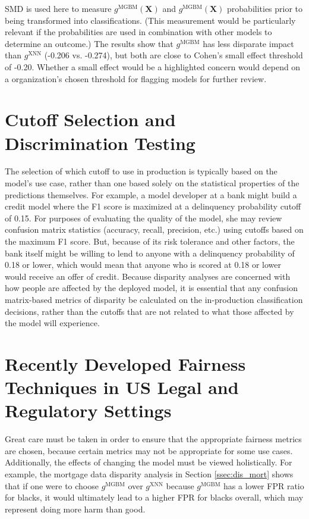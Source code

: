 \documentclass[information,article,submit,moreauthors,pdftex]{definitions/mdpi}
\begin{document}
SMD is used here to measure $g^\text{MGBM}(\mathbf{X})$ and $g^\text{MGBM}(\mathbf{X})$ probabilities prior to being transformed into classifications.  (This measurement would be particularly relevant if the probabilities are used in combination with other models to determine an outcome.)  The results show that $g^\text{MGBM}$ has less disparate impact than $g^\text{XNN}$ (-0.206 vs. -0.274), but both are close to Cohen’s small effect threshold of -0.20. Whether a small effect would be a highlighted concern would depend on a organization’s chosen threshold for flagging models for further review. 

\section{Cutoff Selection and Discrimination Testing}\label{a_sec:cut}

The selection of which cutoff to use in production is typically based on the model’s use case, rather than one based solely on the statistical properties of the predictions themselves.  For example, a model developer at a bank might build a credit model where the F1 score is maximized at a delinquency probability cutoff of 0.15.  For purposes of evaluating the quality of the model, she may review confusion matrix statistics (accuracy, recall, precision, etc.) using cutoffs based on the maximum F1 score. But, because of its risk tolerance and other factors, the bank itself might be willing to lend to anyone with a delinquency probability of 0.18 or lower, which would mean that anyone who is scored at 0.18 or lower would receive an offer of credit.  Because disparity analyses are concerned with how people are affected by the deployed model, it is essential that any confusion matrix-based metrics of disparity be calculated on the in-production classification decisions, rather than the cutoffs that are not related to what those affected by the model will experience.

\section{Recently Developed Fairness Techniques in US Legal and Regulatory Settings}\label{a_sec:comp}

Great care must be taken in order to ensure that the appropriate fairness metrics are chosen, because certain metrics may not be appropriate for some use cases. Additionally, the effects of changing the model must be viewed holistically.  For example, the mortgage data disparity analysis in Section \ref{ssec:dis_mort} shows that if one were to choose $g^\text{MGBM}$ over $g^\text{XNN}$ because $g^\text{MGBM}$ has a lower FPR ratio for blacks, it would ultimately lead to a higher FPR for blacks overall, which may represent doing more harm than good.
\end{document}

